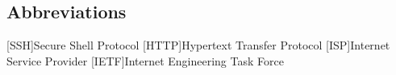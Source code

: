 \newcommand{\abbr}{Abbreviations}
\subsection{Abbreviations}

\begin{acronym}[1234567890]		%
\setlength{\itemsep}{-\parsep}	%

[SSH]{Secure Shell Protocol}
[HTTP]{Hypertext Transfer Protocol}
[ISP]{Internet Service Provider}
[IETF]{Internet Engineering Task Force}
\end{acronym}